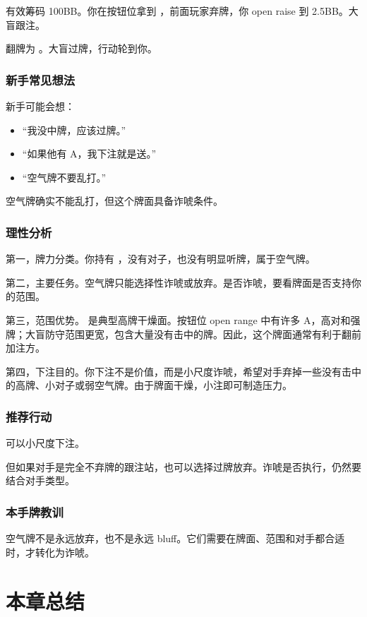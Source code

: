 有效筹码 100BB。你在按钮位拿到 ，前面玩家弃牌，你 open raise 到 2.5BB。大盲跟注。

翻牌为 。大盲过牌，行动轮到你。

\subsubsection*{新手常见想法}

新手可能会想：

\begin{itemize}
\item “我没中牌，应该过牌。”
\item “如果他有 A，我下注就是送。”
\item “空气牌不要乱打。”
\end{itemize}

空气牌确实不能乱打，但这个牌面具备诈唬条件。

\subsubsection*{理性分析}

第一，牌力分类。你持有 ，没有对子，也没有明显听牌，属于空气牌。

第二，主要任务。空气牌只能选择性诈唬或放弃。是否诈唬，要看牌面是否支持你的范围。

第三，范围优势。 是典型高牌干燥面。按钮位 open range 中有许多 A，高对和强牌；大盲防守范围更宽，包含大量没有击中的牌。因此，这个牌面通常有利于翻前加注方。

第四，下注目的。你下注不是价值，而是小尺度诈唬，希望对手弃掉一些没有击中的高牌、小对子或弱空气牌。由于牌面干燥，小注即可制造压力。

\subsubsection*{推荐行动}

可以小尺度下注。

但如果对手是完全不弃牌的跟注站，也可以选择过牌放弃。诈唬是否执行，仍然要结合对手类型。

\subsubsection*{本手牌教训}

空气牌不是永远放弃，也不是永远 bluff。它们需要在牌面、范围和对手都合适时，才转化为诈唬。

\section{本章总结}

